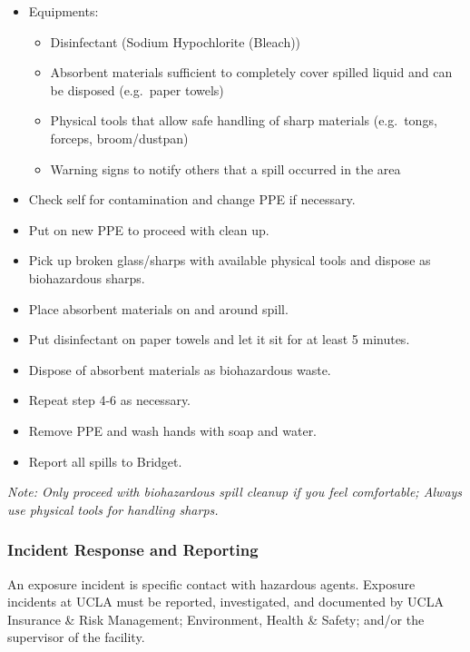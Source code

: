 \documentclass[
]{book}
\providecommand{\tightlist}{%
  \setlength{\itemsep}{0pt}\setlength{\parskip}{0pt}}
\begin{document}
\begin{itemize}
\tightlist
\item
  Equipments:

  \begin{itemize}
  \tightlist
  \item
    Disinfectant (Sodium Hypochlorite (Bleach))
  \item
    Absorbent materials sufficient to completely cover spilled liquid and can be disposed (e.g.~paper towels)
  \item
    Physical tools that allow safe handling of sharp materials (e.g.~tongs, forceps, broom/dustpan)
  \item
    Warning signs to notify others that a spill occurred in the area
  \end{itemize}
\item
  Check self for contamination and change PPE if necessary.
\item
  Put on new PPE to proceed with clean up.
\item
  Pick up broken glass/sharps with available physical tools and dispose as biohazardous sharps.
\item
  Place absorbent materials on and around spill.
\item
  Put disinfectant on paper towels and let it sit for at least 5 minutes.
\item
  Dispose of absorbent materials as biohazardous waste.
\item
  Repeat step 4-6 as necessary.
\item
  Remove PPE and wash hands with soap and water.
\item
  Report all spills to Bridget.
\end{itemize}

\emph{Note: Only proceed with biohazardous spill cleanup if you feel comfortable;
Always use physical tools for handling sharps.}

\hypertarget{incident-response-and-reporting}{%
\subsubsection{Incident Response and Reporting}\label{incident-response-and-reporting}}

An exposure incident is specific contact with hazardous agents. Exposure incidents at UCLA must be reported, investigated, and documented by UCLA Insurance \& Risk Management; Environment, Health \& Safety; and/or the supervisor of the facility.
\end{document}
